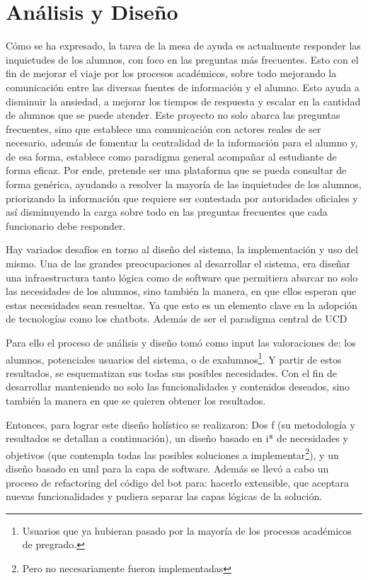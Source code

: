 \chapter{Análisis y Diseño}
    \par Cómo se ha expresado, la tarea de la mesa de ayuda es actualmente responder las inquietudes de los alumnos, con foco en las preguntas más frecuentes. Esto con el fin de mejorar el viaje por los procesos académicos, sobre todo mejorando la comunicación entre las diversas fuentes de información y el alumno. Esto ayuda a disminuir la ansiedad, a mejorar los tiempos de respuesta y escalar en la cantidad de alumnos que se puede atender. Este proyecto no solo abarca las preguntas frecuentes, sino que establece una comunicación con actores reales de ser necesario, además de fomentar la centralidad de la información para el alumno y, de esa forma, establece como paradigma general acompañar al estudiante de forma eficaz. Por ende, pretende ser una plataforma que se pueda consultar de forma genérica, ayudando a resolver la mayoría de las inquietudes de los alumnos, priorizando la información que requiere ser contestada por autoridades oficiales y así disminuyendo la carga sobre todo en las preguntas frecuentes que cada funcionario debe responder.
    
    \par Hay variados desafíos en torno al diseño del sistema, la implementación y uso del mismo. Una de las grandes preocupaciones al desarrollar el sistema, era diseñar una infraestructura tanto lógica como de software que permitiera abarcar no solo las necesidades de los alumnos, sino también la manera, en que ellos esperan que estas necesidades sean resueltas. Ya que esto es un elemento clave en la adopción de tecnologías como los chatbots. Además de ser el paradigma central de \acrlong{UCD}
    
    \par Para ello el proceso de análisis y diseño tomó como input las valoraciones de: los alumnos, potenciales usuarios del sistema, o de exalumnos\footnote{Usuarios que ya hubieran pasado por la mayoría de los procesos académicos de pregrado.}. Y partir de estos resultados, se esquematizan sus todas sus posibles necesidades. Con el fin de desarrollar manteniendo no solo las funcionalidades y contenidos deseados, sino también la manera en que se quieren obtener los resultados.

    \par Entonces, para lograr este diseño holístico se realizaron: Dos \acrlong{f} (su metodología y resultados se detallan a continuación), un diseño basado en \gls{i*} de necesidades y objetivos (que contempla todas las posibles soluciones a implementar\footnote{Pero no necesariamente fueron implementadas}), y un diseño basado en \acrshort{uml} para la capa de software. Además se llevó a cabo un proceso de refactoring del código del bot para: hacerlo extensible, que aceptara nuevas funcionalidades y pudiera separar las capas lógicas de la solución.

